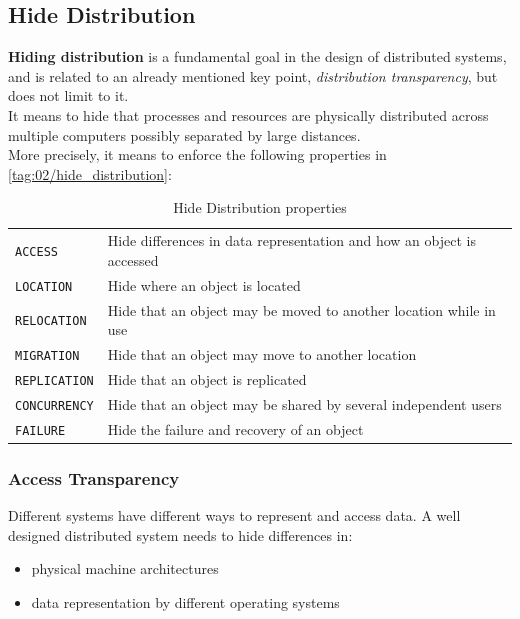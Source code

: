 \subsection{Hide Distribution}
\textbf{Hiding distribution} is a fundamental goal in the design of distributed systems, and is related to an already mentioned key point, \textit{distribution transparency}, but does not limit to it.\\
It means to hide that processes and resources are physically distributed across multiple computers possibly separated by large distances.\\
More precisely, it means to enforce the following properties in \ref{tag:02/hide_distribution}:

\begin{table}[htbp]
   \centering
   \begin{tabular}{|l|l|}
      \texttt{ACCESS} & Hide differences in data representation and how an object is accessed\\
      \texttt{LOCATION} & Hide where an object is located\\
      \texttt{RELOCATION} & Hide that an object may be moved to another location while in use\\
      \texttt{MIGRATION} & Hide that an object may move to another location\\
      \texttt{REPLICATION} & Hide that an object is replicated\\
      \texttt{CONCURRENCY} & Hide that an object may be shared by several independent users\\
      \texttt{FAILURE} & Hide the failure and recovery of an object\\
   \end{tabular}
   \caption{Hide Distribution properties}
   \label{tab:02/hide_distribution}
\end{table}

\subsubsection{Access Transparency}
Different systems have different ways to represent and access data.
A well designed distributed system needs to hide differences in:
\begin{itemize}
   \item physical machine architectures
   \item data representation by different operating systems
\end{itemize}

